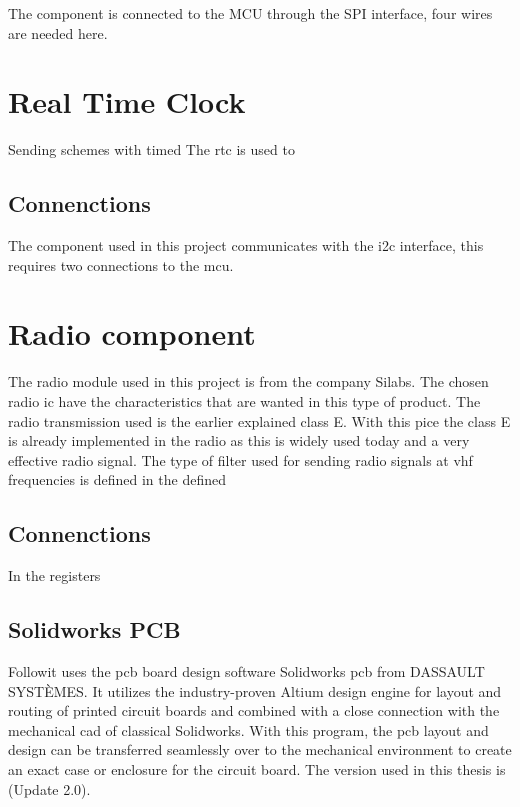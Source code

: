 The component is connected to the MCU through the SPI interface, four wires are needed here. 

\newpage %
\section{Real Time Clock} 
Sending schemes with timed The \gls{rtc} is used to 

\subsection{Connenctions}
The component used in this project communicates with the \gls{i2c} interface, this requires two connections to the \gls{mcu}.


\newpage
\section{Radio component}
 The radio module used in this project is from the company Silabs. The chosen radio \gls{ic} have the characteristics that are wanted in this type of product. The radio transmission used is the earlier explained class E. With this pice the class E is already implemented in the radio as this is widely used today and a very effective radio signal. 
The type of filter used for sending radio signals at \gls{vhf} frequencies is defined in the defined 


\subsection{Connenctions}
 In the registers 


\newpage
\subsection{Solidworks PCB}
Followit uses the \gls{pcb} board design software Solidworks \gls{pcb} from DASSAULT SYSTÈMES. It utilizes the industry-proven Altium design engine for layout and routing of printed circuit boards and combined with a close connection with the mechanical \gls{cad} of classical Solidworks. With this program, the \gls{pcb} layout and design can be transferred seamlessly over to the mechanical environment to create an exact case or enclosure for the circuit board. The version used in this thesis is (Update 2.0).


